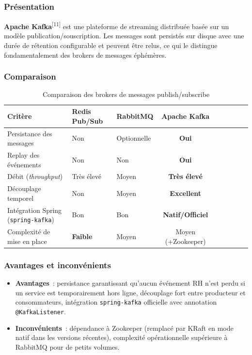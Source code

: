 \subsubsection*{Présentation}

\textbf{Apache Kafka}\textsuperscript{[11]} est une plateforme de streaming distribuée basée sur un modèle
publication/souscription. Les messages sont persistés sur disque avec une durée de
rétention configurable et peuvent être relus, ce qui le distingue fondamentalement
des brokers de messages éphémères.

\subsubsection*{Comparaison}

\begin{table}[H]
\centering
\caption{Comparaison des brokers de messages publish/subscribe}
\label{tab:cmp_kafka}
\begin{tabularx}{\textwidth}{VlVCVCVCV}
\hline
\textbf{Critère} & \textbf{Redis Pub/Sub} & \textbf{RabbitMQ} & \textbf{Apache Kafka} \\
\hline
Persistance des messages     & Non      & Optionnelle & \textbf{Oui} \\
\hline
Replay des événements        & Non      & Non         & \textbf{Oui} \\
\hline
Débit (\textit{throughput})  & Très élevé & Moyen     & \textbf{Très élevé} \\
\hline
Découplage temporel          & Non      & Moyen       & \textbf{Excellent} \\
\hline
Intégration Spring (\texttt{spring-kafka}) & Bon & Bon & \textbf{Natif/Officiel} \\
\hline
Complexité de mise en place  & \textbf{Faible} & Moyen & Moyen (+Zookeeper) \\
\hline
\end{tabularx}
\end{table}

\subsubsection*{Avantages et inconvénients}

\begin{itemize}[leftmargin=*,nosep]
  \item \textbf{Avantages}~: persistance garantissant qu'aucun événement RH n'est
        perdu si un service est temporairement hors ligne, découplage fort entre
        producteur et consommateurs, intégration \texttt{spring-kafka} officielle
        avec annotation \texttt{@KafkaListener}.
  \item \textbf{Inconvénients}~: dépendance à Zookeeper (remplacé par KRaft en mode
        natif dans les versions récentes), complexité opérationnelle supérieure à
        RabbitMQ pour de petits volumes.
\end{itemize}


